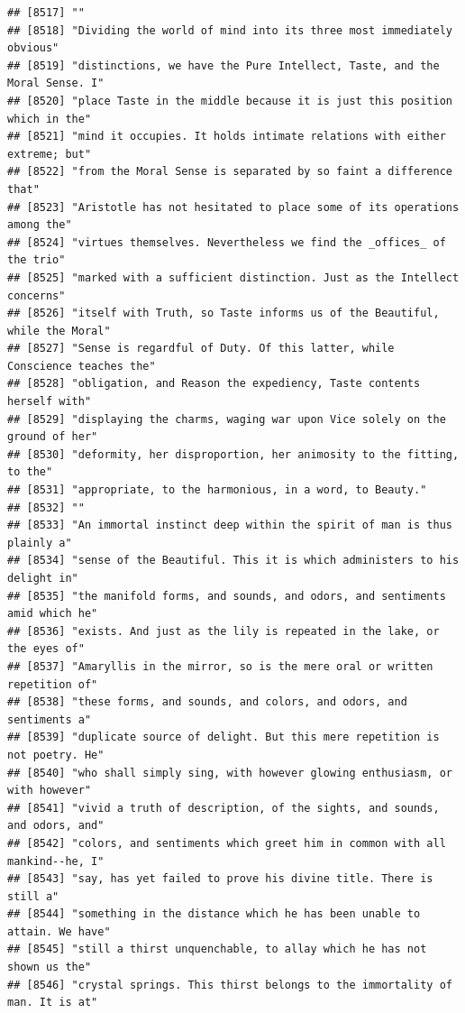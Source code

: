 \documentclass{article}\usepackage[]{graphicx}\usepackage[]{color}
\makeatletter
\newenvironment{kframe}{%
 \def\at@end@of@kframe{}%
 \ifinner\ifhmode%
  \def\at@end@of@kframe{\end{minipage}}%
  \begin{minipage}{\columnwidth}%
 \fi\fi%
 \def\FrameCommand##1{\hskip\@totalleftmargin \hskip-\fboxsep
 \colorbox{shadecolor}{##1}\hskip-\fboxsep
     \hskip-\linewidth \hskip-\@totalleftmargin \hskip\columnwidth}%
 \MakeFramed {\advance\hsize-\width
   \@totalleftmargin\z@ \linewidth\hsize
   \@setminipage}}%
 {\par\unskip\endMakeFramed%
 \at@end@of@kframe}
\newenvironment{knitrout}{}{} %
\makeatother
\begin{document}
\begin{knitrout}
\begin{kframe}
\begin{verbatim}
## [8517] ""                                                                            
## [8518] "Dividing the world of mind into its three most immediately obvious"          
## [8519] "distinctions, we have the Pure Intellect, Taste, and the Moral Sense. I"     
## [8520] "place Taste in the middle because it is just this position which in the"     
## [8521] "mind it occupies. It holds intimate relations with either extreme; but"      
## [8522] "from the Moral Sense is separated by so faint a difference that"             
## [8523] "Aristotle has not hesitated to place some of its operations among the"       
## [8524] "virtues themselves. Nevertheless we find the _offices_ of the trio"          
## [8525] "marked with a sufficient distinction. Just as the Intellect concerns"        
## [8526] "itself with Truth, so Taste informs us of the Beautiful, while the Moral"    
## [8527] "Sense is regardful of Duty. Of this latter, while Conscience teaches the"    
## [8528] "obligation, and Reason the expediency, Taste contents herself with"          
## [8529] "displaying the charms, waging war upon Vice solely on the ground of her"     
## [8530] "deformity, her disproportion, her animosity to the fitting, to the"          
## [8531] "appropriate, to the harmonious, in a word, to Beauty."                       
## [8532] ""                                                                            
## [8533] "An immortal instinct deep within the spirit of man is thus plainly a"        
## [8534] "sense of the Beautiful. This it is which administers to his delight in"      
## [8535] "the manifold forms, and sounds, and odors, and sentiments amid which he"     
## [8536] "exists. And just as the lily is repeated in the lake, or the eyes of"        
## [8537] "Amaryllis in the mirror, so is the mere oral or written repetition of"       
## [8538] "these forms, and sounds, and colors, and odors, and sentiments a"            
## [8539] "duplicate source of delight. But this mere repetition is not poetry. He"     
## [8540] "who shall simply sing, with however glowing enthusiasm, or with however"     
## [8541] "vivid a truth of description, of the sights, and sounds, and odors, and"     
## [8542] "colors, and sentiments which greet him in common with all mankind--he, I"    
## [8543] "say, has yet failed to prove his divine title. There is still a"             
## [8544] "something in the distance which he has been unable to attain. We have"       
## [8545] "still a thirst unquenchable, to allay which he has not shown us the"         
## [8546] "crystal springs. This thirst belongs to the immortality of man. It is at"    

\end{verbatim}
\end{kframe}
\end{knitrout}
\end{document}
